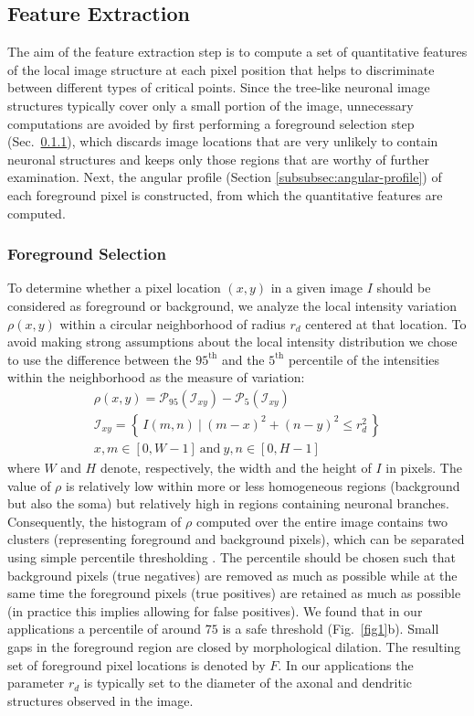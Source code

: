 \subsection{Feature Extraction}
\label{subsec:feature-extraction}
The aim of the feature extraction step is to compute a set of quantitative features of the local image structure at each pixel position that helps to discriminate between different types of critical points. Since the tree-like neuronal image structures typically cover only a small portion of the image, unnecessary computations are avoided by first performing a foreground selection step (Sec.~\ref{subsubsec:foreground-selection}), which discards image locations that are very unlikely to contain neuronal structures and keeps only those regions that are worthy of further examination. Next, the angular profile (Section \ref{subsubsec:angular-profile}) of each foreground pixel is constructed, from which the quantitative features are computed.

\subsubsection{Foreground Selection}
\label{subsubsec:foreground-selection}
To determine whether a pixel location $(x,y)$ in a given image $I$ should be considered as foreground or background, we analyze the local intensity variation $\rho(x,y)$ within a circular neighborhood of radius $r_{d}$ centered at that location. To avoid making strong assumptions about the local intensity distribution we chose to use the difference between the $95^\textrm{th}$ and the $5^\textrm{th}$ percentile of the intensities within the neighborhood as the measure of variation:
\begin{gather} 
\rho(x,y) = \mathcal{P}_{95}(\mathcal{I}_{xy}) - \mathcal{P}_{5}(\mathcal{I}_{xy}) \\
\mathcal{I}_{xy} = \left\{\, I(m,n)\ |\ (m-x)^{2}+(n-y)^{2} \leq r_d^2\, \right\} \\
x,m \in [0,W-1]\ \textrm{and}\ y,n \in [0,H-1]
\end{gather}
where $W$ and $H$ denote, respectively, the width and the height of $I$ in pixels. The value of $\rho$ is relatively low within more or less homogeneous regions (background but also the soma) but relatively high in regions containing neuronal branches. Consequently, the histogram of $\rho$ computed over the entire image contains two clusters (representing foreground and background pixels), which can be separated using simple percentile thresholding \cite{doyle1962operations}. The percentile should be chosen such that background pixels (true negatives) are removed as much as possible while at the same time the foreground pixels (true positives) are retained as much as possible (in practice this implies allowing for false positives). We found that in our applications a percentile of around $75$ is a safe threshold (Fig.~\ref{fig1}b). Small gaps in the foreground region are closed by morphological dilation. The resulting set of foreground pixel locations is denoted by $F$. In our applications the parameter $r_{d}$ is typically set to the diameter of the axonal and dendritic structures observed in the image.


